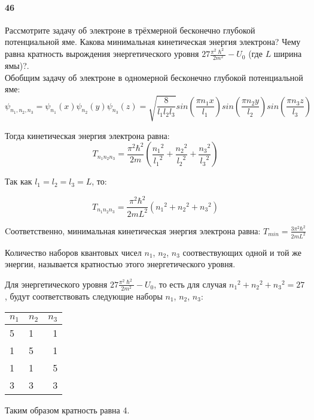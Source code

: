 


\paragraph{46}
Рассмотрите задачу об электроне в трёхмерной бесконечно глубокой потенциальной яме. Какова минимальная кинетическая энергия электрона? Чему равна кратность вырождения энергетического уровня $ 27 \frac{\pi^2\hslash^2}{2m^2}-U_0$ (где $L$ ширина ямы)?.\\

Обобщим задачу об электроне в одномерной бесконечно глубокой потенциальной яме:\\

$$\psi_{{n_1},{n_2},{n_3}}=\psi_{n_1}(x)\psi_{n_2}(y)\psi_{n_3}(z) = \sqrt{\frac{8}{l_1 l_2 l_3}}sin\left(\frac{\pi n_1 x}{l_1}\right)sin\left(\frac{\pi n_2 y}{l_2}\right)sin\left(\frac{\pi n_3 z}{l_3}\right)$$

Тогда кинетическая энергия электрона равна:
$$T_{n_1 n_2 n_3} = \frac{\pi^2\hbar^2}{2m}\left(\frac{{n_1}^2}{{l_1}^2}+\frac{{n_2}^2}{{l_2}^2}+\frac{{n_3}^2}{{l_3}^2}\right)$$

Так как $l_1 = l_2 = l_3 = L$, то: 

$$T_{n_1 n_2 n_3} =  \frac{\pi^2\hbar^2}{2m L^2}\left({n_1}^2+{n_2}^2+{n_3}^2\right)$$

Cоответственно, минимальная кинетическая энергия электрона равна: $T_{min} =   \frac{3\pi^2\hbar^2}{2m L^2}$\\

\begin {definition}
Количество наборов квантовых чисел $n_1$, $n_2$, $n_3$ соотвествующих одной и той же энергии, называется кратностью этого энергетического уровня.
\end {definition}

Для энергетического уровня $ 27 \frac{\pi^2\hslash^2}{2m^2}-U_0$, то есть для случая ${n_1}^2+{n_2}^2+{n_3}^2 = 27$ , будут соответствовать следующие наборы  $n_1$, $n_2$, $n_3$:

\begin {table}[h]
\centering
\begin {tabular}{llr}
\toprule
$n_1$ & $n_2$ & $n_3$ \\
\midrule
5 & 1 & 1 \\
1 & 5 & 1 \\
1 & 1 & 5 \\
3 & 3 & 3 \\
\bottomrule
\end {tabular}
\end {table}

Таким образом кратность равна 4.

